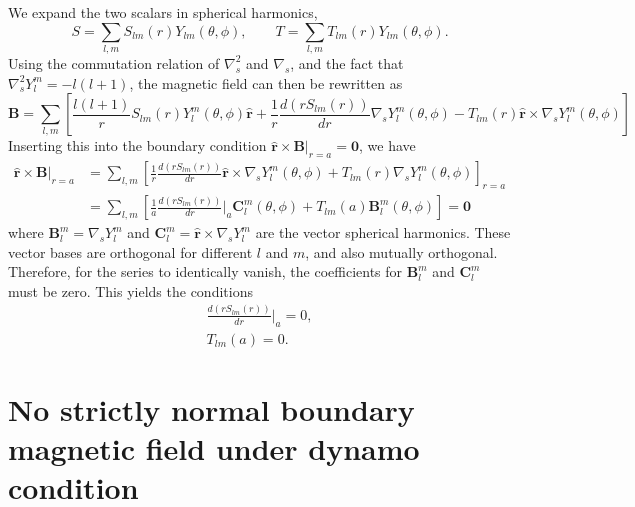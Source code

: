 \documentclass[a4paper, 11pt]{article}
\begin{document}
We expand the two scalars in spherical harmonics,
\begin{equation}
    S = \sum_{l,m} S_{lm}(r) Y_{lm}(\theta, \phi),\qquad 
    T = \sum_{l,m} T_{lm}(r) Y_{lm}(\theta, \phi).
\end{equation}
Using the commutation relation of $\nabla_s^2$ and $\nabla_s$, and the fact that $\nabla_s^2 Y_l^m = -l(l+1)$, the magnetic field can then be rewritten as
\begin{equation}
    \mathbf{B} = \sum_{l,m} \left[\frac{l(l+1)}{r} S_{lm}(r) Y_l^m(\theta, \phi) \hat{\mathbf{r}} + 
    \frac{1}{r}\frac{d(rS_{lm}(r))}{dr} \nabla_s Y_l^m(\theta, \phi) - T_{lm}(r) \hat{\mathbf{r}}\times \nabla_s Y_l^m(\theta, \phi)\right]
\end{equation}
Inserting this into the boundary condition $\hat{\mathbf{r}}\times \mathbf{B}|_{r=a} = \mathbf{0}$, we have
\begin{equation}
\begin{aligned}
    \hat{\mathbf{r}}\times \mathbf{B}|_{r=a} &= \sum_{l,m} \left[\frac{1}{r}\frac{d(rS_{lm}(r))}{dr} \hat{\mathbf{r}}\times \nabla_s Y_l^m(\theta, \phi) + T_{lm}(r) \nabla_s Y_l^m(\theta, \phi) \right]_{r=a} \\ 
    &= \sum_{l,m} \left[\frac{1}{a}\frac{d(rS_{lm}(r))}{dr}\Big|_{a} \mathbf{C}_l^m(\theta, \phi) + T_{lm}(a) \mathbf{B}_l^m(\theta, \phi) \right] = \mathbf{0}
\end{aligned}
\end{equation}
where $\mathbf{B}_l^m = \nabla_s Y_l^m$ and $\mathbf{C}_l^m = \hat{\mathbf{r}}\times \nabla_s Y_l^m$ are the vector spherical harmonics. These vector bases are orthogonal for different $l$ and $m$, and also mutually orthogonal. Therefore, for the series to identically vanish, the coefficients for $\mathbf{B}_l^m$ and $\mathbf{C}_l^m$ must be zero. This yields the conditions
\begin{equation}\label{eqn:cond-normal}
\begin{aligned}
    \frac{d(rS_{lm}(r))}{dr}\Big|_{a} = 0, \\ 
    T_{lm}(a) = 0.
\end{aligned}
\end{equation}


\section{No strictly normal boundary magnetic field under dynamo condition}
\end{document}
